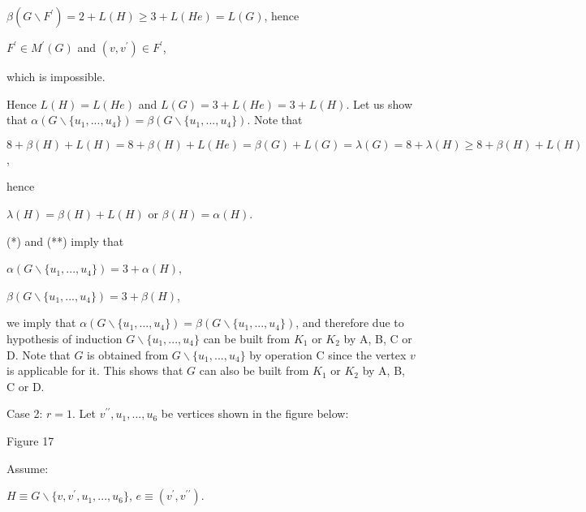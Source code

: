 \documentclass{article}
\begin{document}
\begin{center}
$\beta (G\backslash F^{\prime })=2+L(H)\geq 3+L(He)=L(G)$, hence

$F^{\prime }\in M^{\prime }(G)$ and $(v,v^{\prime })\in F^{\prime }$,
\end{center}

which is impossible.

Hence $L(H)=L(He)$ and $L(G)=3+L(He)=3+L(H)$. Let us show that $\alpha
(G\backslash \{u_{1},...,u_{4}\})=\beta (G\backslash \{u_{1},...,u_{4}\})$.
Note that

\begin{center}
$8+\beta (H)+L(H)=8+\beta (H)+L(He)=\beta (G)+L(G)=\lambda (G)=8+\lambda
(H)\geq 8+\beta (H)+L(H)$,
\end{center}

hence

\begin{center}
$\lambda (H)=\beta (H)+L(H)$ or $\beta (H)=\alpha (H)$.
\end{center}

(*) and (**) imply that

\begin{center}
$\alpha (G\backslash \{u_{1},...,u_{4}\})=3+\alpha (H)$,

$\beta (G\backslash \{u_{1},...,u_{4}\})=3+\beta (H)$,
\end{center}

we imply that $\alpha (G\backslash \{u_{1},...,u_{4}\})=\beta (G\backslash
\{u_{1},...,u_{4}\})$, and therefore due to hypothesis of induction $G\backslash \{u_{1},...,u_{4}\}$ can be built from $K_{1}$ or $K_{2}$ by A,
B, C or D. Note that $G$ is obtained from $G\backslash \{u_{1},...,u_{4}\}$
by operation C since the vertex $v$ is applicable for it. This shows that $G$
can also be built from $K_{1}$ or $K_{2}$ by A, B, C or D.

Case 2: $r=1$. Let $v^{\prime \prime },u_{1},...,u_{6}$ be vertices shown in
the figure below:

\begin{center}

Figure 17\bigskip
\end{center}

Assume:

\begin{center}
$H\equiv G\backslash \{v,v^{\prime },u_{1},...,u_{6}\}$, $e\equiv (v^{\prime
},v^{\prime \prime })$.
\end{center}
\end{document}

